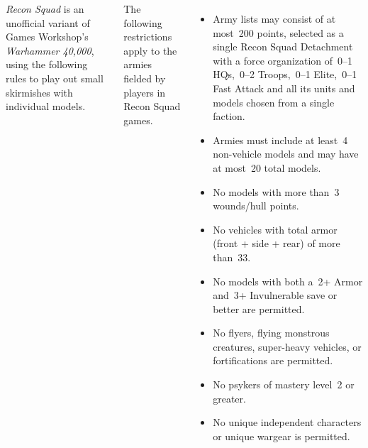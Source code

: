 
\begin{columns}

  \emph{Recon Squad} is an unofficial variant of Games Workshop's
  \emph{Warhammer 40,000}, using the following rules to play out small
  skirmishes with individual models.
 
%

The following restrictions apply to the armies fielded by players in
Recon Squad games.
  \begin{itemize}
  \item Army lists may consist of at most~200 points, selected as a
    single Recon Squad Detachment with a force organization of~0--1
    HQs,~0--2 Troops,~0--1 Elite,~0--1 Fast Attack and all its units
    and models chosen from a single faction.

  \item Armies must include at least~4 non-vehicle models and may have
    at most~20 total models.

  \item No models with more than~3 wounds/hull points.

  \item No vehicles with total armor (front + side + rear) of more
    than~33.

  \item No models with both a~2+ Armor and~3+ Invulnerable save or
    better are permitted.

  \item No flyers, flying monstrous creatures, super-heavy vehicles,
    or fortifications are permitted.

  \item No psykers of mastery level~2 or greater.

  \item No unique independent characters or unique wargear is
    permitted.

  \end{itemize}


\end{columns}
